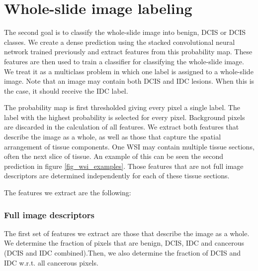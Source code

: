 \documentclass[journal]{IEEEtran}
\begin{document}


\section{Whole-slide image labeling}
The second goal is to classify the whole-slide image into benign, DCIS or DCIS classes. We create a dense prediction using the stacked convolutional neural network trained previously and extract features from this probability map. These features are then used to train a classifier for classifying the whole-slide image. We treat it as a multiclass problem in which one label is assigned to a whole-slide image. Note that an image may contain both DCIS and IDC lesions. When this is the case, it should receive the IDC label.

The probability map is first thresholded giving every pixel a single label. The label with the highest probability is selected for every pixel. Background pixels are discarded in the calculation of all features. 
We extract both features that describe the image as a whole, as well as those that capture the spatial arrangement of tissue components. One WSI may contain multiple tissue sections, often the next slice of tissue. An example of this can be seen the second prediction in figure \ref{fig_wsi_examples}. Those features that are not full image descriptors are determined independently for each of these tissue sections.


The features we extract are the following:

\subsubsection{Full image descriptors}
The first set of features we extract are those that describe the image as a whole. We determine the fraction of pixels that are benign, DCIS, IDC and cancerous (DCIS and IDC combined).Then, we also determine the fraction of DCIS and IDC w.r.t. all cancerous pixels.
\end{document}
